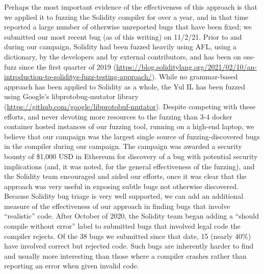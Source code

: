 \begin{sloppypar}
  Perhaps the most important evidence of the effectiveness of this approach is that we applied it to fuzzing the Solidity compiler for over a year, and in that time reported a large number of otherwise unreported bugs that have been fixed; we submitted our most recent bug (as of this writing) on 11/2/21.  Prior to and during our campaign, Solidity had been fuzzed heavily using AFL, using a dictionary, by the developers and by external contributors, and has been on oss-fuzz since the first quarter of 2019 (\url{https://blog.soliditylang.org/2021/02/10/an-introduction-to-soliditys-fuzz-testing-approach/}).  While no grammar-based approach has been applied to Solidity as a whole, the Yul IL has been fuzzed using Google's libprotobug-mutator library (\url{https://github.com/google/libprotobuf-mutator}).  Despite competing with these efforts, and never devoting more resources to the fuzzing than 3-4 docker container hosted instances of our fuzzing tool, running on a high-end laptop, we believe that our campaign was the largest single source of fuzzing-discovered bugs in the compiler during our campaign.  The campaign was awarded a security bounty of \$1,000 USD in Ethereum for discovery of a bug with potential security implications (and, it was noted, for the general effectiveness of the fuzzing), and the Solidity team encouraged and aided our efforts, once it was clear that the approach was very useful in exposing subtle bugs not otherwise discovered.  Because Solidity bug triage is very well supported, we can add an additional measure of the effectiveness of our approach in finding bugs that involve ``realistic'' code.  After October of 2020, the Solidity team began adding a ``should compile without error'' label to submitted bugs that involved legal code the compiler rejects.  Of the 38 bugs we submitted since that date, 15 (nearly 40\%) have involved correct but rejected code.  Such bugs are inherently harder to find and usually more interesting than those where a compiler crashes rather than reporting an error when given invalid code.
\end{sloppypar}

